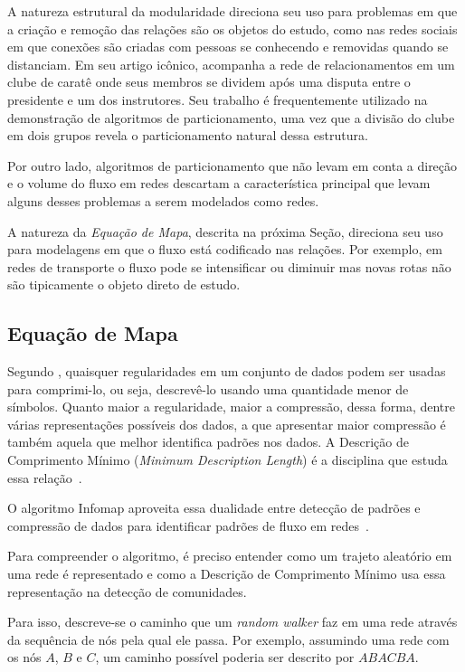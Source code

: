 \documentclass[12pt,a4paper]{article}
\begin{document}
A natureza estrutural da modularidade direciona seu uso para problemas em que a criação e remoção das relações são os objetos do estudo, como nas redes sociais em que conexões são criadas com pessoas se conhecendo e removidas quando se distanciam. Em seu artigo icônico,  acompanha a rede de relacionamentos em um clube de caratê onde seus membros se dividem após uma disputa entre o presidente e um dos instrutores. Seu trabalho é frequentemente utilizado na demonstração de algoritmos de particionamento, uma vez que a divisão do clube em dois grupos revela o particionamento natural dessa estrutura.

Por outro lado, algoritmos de particionamento que não levam em conta a direção e o volume do fluxo em redes descartam a característica principal que levam alguns desses problemas a serem modelados como redes.

A natureza da \textit{Equação de Mapa}, descrita na próxima Seção, direciona seu uso para modelagens em que o fluxo está codificado nas relações. Por exemplo, em redes de transporte o fluxo pode se intensificar ou diminuir mas novas rotas não são tipicamente o objeto direto de estudo.

\subsection{Equação de Mapa} \label{sec:infomap}

Segundo , quaisquer regularidades em um conjunto de dados podem ser usadas para comprimi-lo, ou seja, descrevê-lo usando uma quantidade menor de símbolos. Quanto maior a regularidade, maior a compressão, dessa forma, dentre várias representações possíveis dos dados, a que apresentar maior compressão é também aquela que melhor identifica padrões nos dados. A Descrição de Comprimento Mínimo (\textit{Minimum Description Length}) é a disciplina que estuda essa relação~\cite{Grunwald2007-bt}.

O algoritmo Infomap aproveita essa dualidade entre detecção de padrões e compressão de dados para identificar padrões de fluxo em redes~\cite{Rosvall2009-sd}.

Para compreender o algoritmo, é preciso entender como um trajeto aleatório em uma rede é representado e como a Descrição de Comprimento Mínimo usa essa representação na detecção de comunidades.

Para isso, descreve-se o caminho que um \textit{random walker} faz em uma rede através da sequência de nós pela qual ele passa. Por exemplo, assumindo uma rede com os nós $A$, $B$ e $C$, um caminho possível poderia ser descrito por $ABACBA$.
\end{document}
